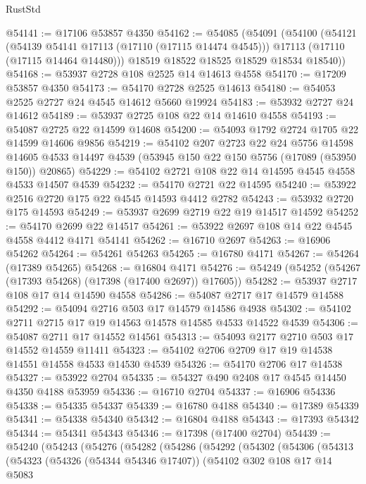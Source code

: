 \begin{lexlean}{RustStd}
\begin{coremodule}
@54141 := @17106 @53857 @4350
@54162 := @54085
    (@54091
      (@54100
        (@54121
          (@54139 @54141 @17113 (@17110 (@17115 @14474 @4545)))
          @17113
          (@17110 (@17115 @14464 @14480)))
        @18519
        @18522
        @18525
        @18529
        @18534
        @18540))
@54168 := @53937 @2728 @108 @2525 @14 @14613 @4558
@54170 := @17209 @53857 @4350
@54173 := @54170 @2728 @2525 @14613
@54180 := @54053 @2525 @2727 @24 @4545 @14612 @5660 @19924
@54183 := @53932 @2727 @24 @14612
@54189 := @53937 @2725 @108 @22 @14 @14610 @4558
@54193 := @54087 @2725 @22 @14599 @14608
@54200 := @54093 @1792 @2724 @1705 @22 @14599 @14606 @9856
@54219 := @54102
    @207
    @2723
    @22
    @24
    @5756
    @14598
    @14605
    @4533
    @14497
    @4539
    (@53945 @150 @22 @150 @5756 (@17089 (@53950 @150)) @20865)
@54229 := @54102 @2721 @108 @22 @14 @14595 @4545 @4558 @4533 @14507 @4539
@54232 := @54170 @2721 @22 @14595
@54240 := @53922 @2516 @2720 @175 @22 @4545 @14593 @4412 @2782
@54243 := @53932 @2720 @175 @14593
@54249 := @53937 @2699 @2719 @22 @19 @14517 @14592
@54252 := @54170 @2699 @22 @14517
@54261 := @53922 @2697 @108 @14 @22 @4545 @4558 @4412 @4171 @54141
@54262 := @16710 @2697
@54263 := @16906 @54262
@54264 := @54261 @54263
@54265 := @16780 @4171
@54267 := @54264 (@17389 @54265)
@54268 := @16804 @4171
@54276 := @54249 (@54252 (@54267 (@17393 @54268) (@17398 (@17400 @2697)) @17605))
@54282 := @53937 @2717 @108 @17 @14 @14590 @4558
@54286 := @54087 @2717 @17 @14579 @14588
@54292 := @54094 @2716 @503 @17 @14579 @14586 @4938
@54302 := @54102 @2711 @2715 @17 @19 @14563 @14578 @14585 @4533 @14522 @4539
@54306 := @54087 @2711 @17 @14552 @14561
@54313 := @54093 @2177 @2710 @503 @17 @14552 @14559 @11411
@54323 := @54102 @2706 @2709 @17 @19 @14538 @14551 @14558 @4533 @14530 @4539
@54326 := @54170 @2706 @17 @14538
@54327 := @53922 @2704
@54335 := @54327 @490 @2408 @17 @4545 @14450 @4350 @4188 @53959
@54336 := @16710 @2704
@54337 := @16906 @54336
@54338 := @54335 @54337
@54339 := @16780 @4188
@54340 := @17389 @54339
@54341 := @54338 @54340
@54342 := @16804 @4188
@54343 := @17393 @54342
@54344 := @54341 @54343
@54346 := @17398 (@17400 @2704)
@54439 := @54240
    (@54243
      (@54276
        (@54282
          (@54286
            (@54292
              (@54302
                (@54306
                  (@54313
                    (@54323
                      (@54326 (@54344 @54346 @17407))
                      (@54102
                        @302
                        @108
                        @17
                        @14
                        @5083

\end{coremodule}
\end{lexlean}

